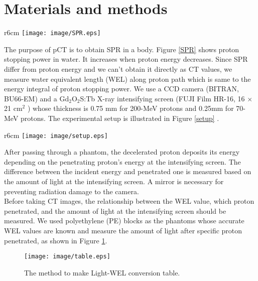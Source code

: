 \documentclass[preprint,3pt]{elsarticle} %
\begin{document}
{\section{Materials and methods}
\begin{wrapfigure}{r}{6cm}%
\vspace*{-\intextsep} %
\texttt{[image: image/SPR.eps]}
\caption{Proton stopping power in water }
\label{SPR}
\end{wrapfigure} 
	The purpose of pCT is to obtain SPR in a body. Figure \ref{SPR} shows proton stopping power in water. It increases when proton energy decreases. Since SPR differ from proton energy and we can't obtain it directly as CT values, we measure water equivalent length (WEL) along proton path which is same to the energy integral of proton stopping power. We use a CCD camera (BITRAN, BU66-EM) and a Gd$_{2}$O$_{2}$S:Tb X-ray intensifying screen (FUJI Film HR-16, 16 $\times$ 21 cm$^2$ ) whose thickness is 0.75 mm for 200-MeV protons and 0.25mm for 70-MeV protons. The experimental setup is illustrated in Figure \ref{setup} {\cite{mrtanaka}}. \\
\begin{wrapfigure}{r}{6cm} 
\vspace*{-\intextsep} 
\texttt{[image: image/setup.eps]}
\caption{Diagram of experimental setup. The proton beam types mimic the passive scattering and spot scanning systems. }
\label{setup}
\end{wrapfigure}
After passing through a phantom, the decelerated proton deposits its energy depending on the penetrating proton's energy at the intensifying screen. The difference between the incident energy and penetrated one is measured based on the amount of light at the intensifying screen. A mirror is necessary for preventing radiation damage to the camera.\\
	Before taking CT images, the relationship between the WEL value, which proton penetrated, and the amount of light at the intensifying screen should be measured. We used polyethylene (PE) blocks as the phantoms whose accurate WEL values are known and measure the amount of light after specific proton penetrated, as shown in Figure \ref{table}.\\
\begin{figure}[h]
\centering
\texttt{[image: image/table.eps]}
\caption[The method to make Light-WEL conversion table.]{The method to make Light-WEL conversion table.}
\label{table}
\end{figure}

}
\end{document}
